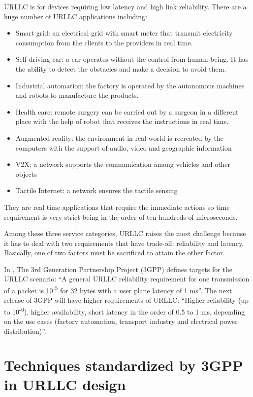 \documentclass{report}
\begin{document}
URLLC is for devices requiring low latency and high link reliability. There are a huge number of URLLC applications including:
\begin{itemize}
    \item Smart grid: an electrical grid with smart meter that transmit electricity consumption from the clients to the providers in real time.
    \item Self-driving car: a car operates without the control from human being. It has the ability to detect the obstacles and make a decision to avoid them.
    \item Industrial automation: the factory is operated by the autonomous machines and robots to manufacture the products.
    \item Health care: remote surgery can be carried out by a surgeon in a different place with the help of robot that receives the instructions in real time.
    \item Augmented reality: the environment in real world is recreated by the computers with the support of audio, video and geographic information
    \item V2X: a network supports the communication among vehicles and other objects
    \item Tactile Internet: a network ensures the tactile sensing 
\end{itemize}

They are real time applications that require the immediate actions so time requirement is very strict being in the order of ten-hundreds of microseconds. 

Among these three service categories, URLLC raises the most challenge because it has to deal with two requirements that have trade-off: reliability and latency. Basically, one of two factors must be sacrificed to attain the other factor. 

In \cite{ad1}, The 3rd Generation Partnership Project (3GPP) defines targets for the URLLC scenario: ``A general URLLC reliability requirement for one transmission of a packet is 10\textsuperscript{-5} for 32 bytes with a user plane latency of 1 ms''. The next release of 3GPP will have higher requirements of URLLC: ``Higher reliability (up to 10\textsuperscript{-6}), higher availability, short latency in the order of 0.5 to 1 ms, depending on the use cases (factory automation, transport industry and electrical power distribution)''\cite{ad2}.


\section{Techniques standardized by 3GPP in URLLC design}
\end{document}
